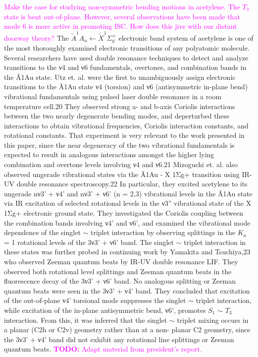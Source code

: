 \documentclass[12pt,draft]{mitthesis}
\newcommand{\TODO} [1]{\textcolor{magenta}{\textbf{TODO:} #1}}
\newcommand{\POINT}[1]{\textcolor{magenta}{#1}}
\begin{document}
\POINT{Make the case for studying non-symmetric bending motions in
  acetylene.  The $T_3$ state is bent out-of-plane.  However, several
  observations have been made that mode 6 is more active in promoting
  ISC.  How does this jive with our distant doorway theory?}  The
$\tilde{A} ^1A_u \leftarrow \tilde{X} ^1\Sigma_g^+$ electronic band
system of acetylene is one of the most thoroughly examined electronic
transitions of any polyatomic molecule.  Several researchers
have used double resonance techniques to detect and analyze
transitions to the ν4 and ν6 fundamentals, overtones, and combination
bands in the Ã1Au state. Utz et. al. were the first to unambiguously
assign electronic transitions to the Ã1Au state ν4 (torsion) and ν6
(antisymmetric in-plane bend) vibrational fundamentals using pulsed
laser double resonance in a room temperature cell.20 They observed
strong a- and b-axis Coriolis interactions between the two nearly
degenerate bending modes, and deperturbed these interactions to obtain
vibrational frequencies, Coriolis interaction constants, and
rotational constants.  That experiment is very relevant to the work
presented in this paper, since the near degeneracy of the two
vibrational fundamentals is expected to result in analogous
interactions amongst the higher lying combination and overtone levels
involving ν4 and ν6.21 Mizoguchi et. al. also observed ungerade
vibrational states via the Ã1Au - X 1Σg+ transition using IR-UV double
resonance spectroscopy.22 In particular, they excited acetylene to its
ungerade nν3’ + ν4’ and nν3’ + ν6’ (n = 2,3) vibrational levels in the
Ã1Au state via IR excitation of selected rotational levels in the ν3”
vibrational state of the X 1Σg+ electronic ground state.  They
investigated the Coriolis coupling between the combination bands
involving ν4’ and ν6’, and examined the vibrational mode dependence of
the singlet $\sim$ triplet interaction by observing splittings in the
$K_a$ = 1 rotational levels of the 3ν3’ + ν6’ band. The singlet $\sim$
triplet interaction in these states was further probed in continuing
work by Yamakita and Tsuchiya,23 who observed Zeeman quantum beats by
IR-UV double resonance LIF. They observed both rotational level
splittings and Zeeman quantum beats in the fluorescence decay of the
3ν3’ + ν6’ band.  No analogous splitting or Zeeman quantum beats were
seen in the 3ν3’ + ν4’ band. They concluded that excitation of the
out-of-plane ν4’ torsional mode suppresses the singlet $\sim$ triplet
interaction, while excitation of the in-plane antisymmetric bend, ν6’,
promotes $S_1$ $\sim$ $T_3$ interaction. From this, it was inferred
that the singlet $\sim$ triplet mixing occurs in a planar (C2h or C2v)
geometry rather than at a non- planar C2 geometry, since the 3ν3’ +
ν4’ band did not exhibit any rotational line splittings or Zeeman
quantum beats.  \TODO{Adapt material from president's report.}
\end{document}

